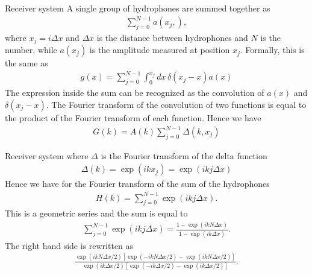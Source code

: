 \documentclass[xcolor=dvipsnames,notes]{beamer}
\begin{document}
\begin{frame}{Receiver system}
A single group of hydrophones are summed together as
\begin{eqnarray}
\sum_{j=0}^{N-1} a(x_j,),
                     \label{eq:array}
\end{eqnarray}
where $x_j = i\Delta x$
and $\Delta x$ is the distance between hydrophones and $N$
is the number, while $a(x_j)$ is the amplitude measured 
at position $x_j$.
Formally, this is the same as
\begin{eqnarray}
 g(x)= \sum_{j=0}^{N-1}\int_{0}^{x_j} dx\, \delta(x_j-x)a(x)
                     \label{eq:array2}
\end{eqnarray}
The expression inside the sum can be recognized as the convolution of $a(x)$
and $\delta(x_j-x)$. The Fourier transform of the convolution of two functions
is equal to the product of the Fourier transform of each function. Hence
we have
\begin{eqnarray}
G(k) = A(k)\sum_{j=0}^{N-1}\Delta(k,x_j)
\end{eqnarray}
\end{frame}
\begin{frame}{Receiver system}
where $\Delta$ is the Fourier transform of the delta function
\begin{eqnarray}
\Delta(k) = \exp(ikx_j) = \exp(ik j\Delta x)
\end{eqnarray}
Hence we have for the Fourier transform of the sum of the hydrophones
\begin{eqnarray}
H(k)=\sum_{j=0}^{N-1}\exp(ik j\Delta x).
\end{eqnarray}
This is a geometric series and the sum is equal to
%
\begin{eqnarray}
\sum_{j=0}^{N-1}\exp(ik j\Delta x) = \frac{1-\exp(ik N \Delta x)}
                                         {1-\exp(ik \Delta x)}.
\end{eqnarray}
%
The right hand side is rewritten as
%
\begin{eqnarray}
             \frac{\exp(ik  N\Delta x/2)
                   \left[\exp(-ikN\Delta x/2)
                  -\exp(ik N \Delta x/2)\right]}
                  {\exp(ik\Delta x/2)
                   \left[\exp(-ik\Delta x/2)-\exp(ik \Delta x/2)\right]}.
\end{eqnarray}
\end{frame}
%
\end{document}

